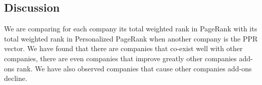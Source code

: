 \documentclass[11pt,oneside]{book}
\let\Oldsection\section
\renewcommand{\section}{\FloatBarrier\Oldsection}
\begin{document}
\section{Discussion}
We are comparing for each company its total weighted rank in PageRank with its total weighted rank in Personalized PageRank when another company is the PPR vector.
We have found that there are companies that co-exist well with other companies, there are even companies that improve greatly other companies add-ons rank.
We have also observed companies that cause other companies add-ons decline.



%
\newpage
\appendix
\chapter{} 
\renewcommand{\figurename}{Appendix}
\end{document}
